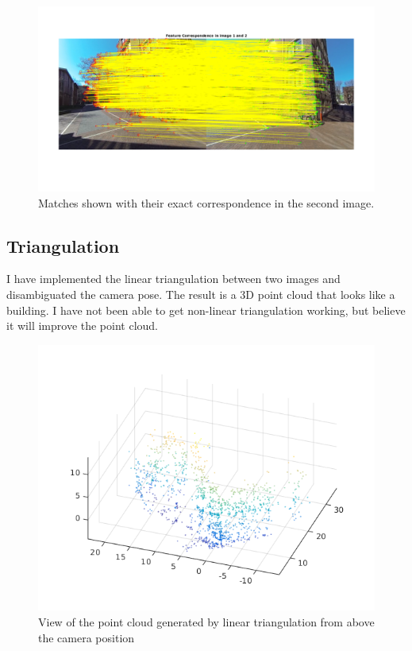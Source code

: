 \documentclass{article}
\begin{document}
\begin{figure}[!h]
\includegraphics[width = \textwidth]{matches.png}
\centering
\caption{Matches shown with their exact correspondence in the second image. }
\end{figure}
\FloatBarrier
\subsection{Triangulation}
I have implemented the linear triangulation between two images and disambiguated the camera pose. The result is a 3D point cloud that looks like a building. I have not been able to get non-linear triangulation working, but believe it will improve the point cloud.
\FloatBarrier

\begin{figure}[!h]
\includegraphics[width = \textwidth]{lin_tri.png}
\centering
\caption{View of the point cloud generated by linear triangulation from above the camera position}
\end{figure}
\end{document}
